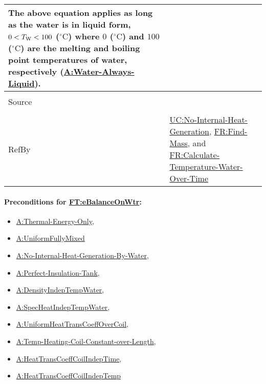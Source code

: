 \documentclass[12pt]{article}
\newcommand{\lt}{\ensuremath <}
\begin{document}
\begin{minipage}{\textwidth}
\begin{tabular}{>{\raggedright}p{}>{\raggedright\arraybackslash}p{}}
The above equation applies as long as the water is in liquid form,
$0\lt{}{T_{\text{W}}}\lt{}100$ (${{}^{\circ}\text{C}}$) where $0$
(${{}^{\circ}\text{C}}$) and $100$ (${{}^{\circ}\text{C}}$) are the melting and
boiling point temperatures of water, respectively
(\hyperref[assumpWAL]{A:Water-Always-Liquid}).
        
\\ \midrule \\
Source & \cite[(with PCM removed)]{koothoor2013}

\\ \midrule \\
RefBy & \hyperref[unlikeChgNIHG]{UC:No-Internal-Heat-Generation},
\hyperref[findMass]{FR:Find-Mass}, and
\hyperref[calcTempWtrOverTime]{FR:Calculate-Temperature-Water-Over-Time}
        
\\ \bottomrule
\end{tabular}
\end{minipage}


\paragraph{Preconditions for \hyperref[FT:eBalanceOnWtr]{FT:eBalanceOnWtr}:}
\label{FT:eBalanceOnWtrPrecond}

\begin{itemize}
\item \hyperref[assumpTEO]{A:Thermal-Energy-Only},
\item \hyperref[assumpFullyMixed]{A:UniformFullyMixed}
\item \hyperref[assumpNIHGBW]{A:No-Internal-Heat-Generation-By-Water},
\item \hyperref[assumpPIT]{A:Perfect-Insulation-Tank},
\item \hyperref[assumpDensIndepTWater]{A:DensityIndepTempWater},
\item \hyperref[assumpSpecHeatIndepTWater]{A:SpecHeatIndepTempWater},
\item \hyperref[assumpUnifHeatTransCoeffCoil]{A:UniformHeatTransCoeffOverCoil},
\item \hyperref[assumpTHCCoL]{A:Temp-Heating-Coil-Constant-over-Length},
\item \hyperref[assumpHeatTransCoilIndepTime]{A:HeatTransCoeffCoilIndepTime},
\item \hyperref[assumpHeatTransCoilIndepTemp]{A:HeatTransCoeffCoilIndepTemp}
\end{itemize}
\end{document}
